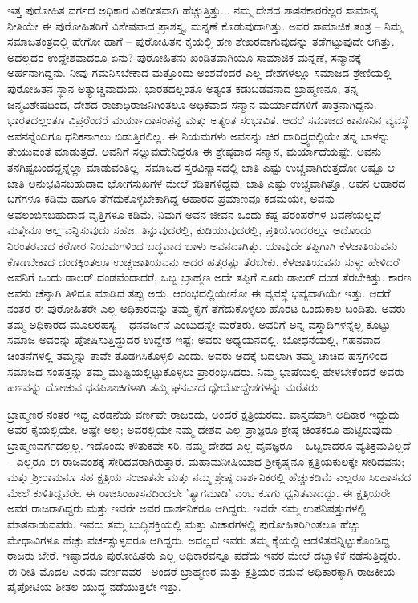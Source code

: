 ಇತ್ತ ಪುರೋಹಿತ ವರ್ಗದ ಅಧಿಕಾರ ವಿಪರೀತವಾಗಿ ಹೆಚ್ಚುತ್ತಿತ್ತು... ನಮ್ಮ ದೇಶದ ಶಾಸನಕಾರರೆಲ್ಲರ ಸಾಮಾನ್ಯ ನೀತಿಯೇ ಈ ಪುರೋಹಿತರಿಗೆ ವಿಶೇಷವಾದ ಪ್ರಾಶಸ್ತ್ಯ, ಮನ್ನಣೆ ಕೊಡುವುದಾಗಿತ್ತು. ಅವರ ಸಾಮಾಜಿಕ ತಂತ್ರ – ನಿಮ್ಮ ಸಮಾಜತಂತ್ರದಲ್ಲಿ ಹೇಗೋ ಹಾಗೆ – ಪುರೋಹಿತನ ಕೈಯಲ್ಲಿ ಹಣ ಶೇಖರವಾಗುವುದನ್ನು ತಡೆಗಟ್ಟುವುದೇ ಆಗಿತ್ತು. ಅದೆಲ್ಲದರ ಉದ್ದೇಶವಾದರೂ ಏನು? ಪುರೋಹಿತನು ಖಂಡಿತವಾಗಿಯೂ ಸಾಮಾಜಿಕ ಮನ್ನಣೆ, ಸನ್ಮಾನಕ್ಕೆ ಅರ್ಹನಾಗಿದ್ದನು. ನೀವು ಗಮನಿಸಬೇಕಾದ ಮತ್ತೊಂದು ಅಂಶವೆಂದರೆ ಎಲ್ಲ ದೇಶಗಳಲ್ಲೂ ಸಮಾಜದ ಶ್ರೇಣಿಯಲ್ಲಿ ಪುರೋಹಿತನ ಸ್ಥಾನ ಅತ್ಯುಚ್ಚವಾದುದು. ಭಾರತದಲ್ಲಂತೂ ಅತ್ಯಂತ ಕಡುಬಡವನಾದ ಬ್ರಾಹ್ಮಣನೂ, ತನ್ನ ಜನ್ಮವಿಶೇಷದಿಂದ, ದೇಶದ ರಾಜಾಧಿರಾಜನಿಗಿಂತಲೂ ಅಧಿಕವಾದ ಸನ್ಮಾನ ಮರ್ಯಾದೆಗಳಿಗೆ ಪಾತ್ರನಾಗಿದ್ದನು. ಭಾರತದಲ್ಲಂತೂ ವಿಪ್ರರೆಂದರೆ ಮರ್ಯಾದಾಸಂಪನ್ನ ಮತ್ತು ಅತ್ಯಂತ ಸಂಭಾವಿತ. ಆದರೆ ಸಮಾಜದ ಕಾನೂನಿನ ವ್ಯವಸ್ಥೆ ಅವನನ್ನೆಂದಿಗೂ ಧನಿಕನಾಗಲು ಬಿಡುತ್ತಿರಲಿಲ್ಲ. ಈ ನಿಯಮಗಳು ಅವನನ್ನು ಚಿರ ದಾರಿದ್ರ್ಯದಲ್ಲಿಯೇ ತನ್ನ ಬಾಳನ್ನು ತೇಯುವಂತೆ ಮಾಡುತ್ತದೆ. ಅವನಿಗೆ ಸಲ್ಲುವುದೇನಿದ್ದರೂ ಈ ಶ್ರೇಷ್ಠವಾದ ಸನ್ಮಾನ, ಮರ್ಯಾದೆಯಷ್ಟೇ. ಅವನು ತನಗಿಷ್ಟಬಂದದ್ದನ್ನೆಲ್ಲಾ ಮಾಡುವಂತಿಲ್ಲ. ಸಮಾಜದ ಸ್ತರವಿನ್ಯಾಸದಲ್ಲಿ ಜಾತಿ ಎಷ್ಟು ಉಚ್ಚವಾಗಿರುತ್ತದೋ ಅಷ್ಟೂ ಆ ಜಾತಿ ಅನುಭವಿಸಬಹುದಾದ ಭೋಗಸುಖಗಳ ಮೇಲೆ ಕಡಿತಗಳಿದ್ದವು. ಜಾತಿ ಎಷ್ಟು ಉಚ್ಚವಾಗಿತ್ತೊ, ಅವನ ಆಹಾರದ ಬಗೆಗಳೂ ಕಡಿಮೆ ಹಾಗೂ ತೆಗೆದುಕೊಳ್ಳಬೇಕಾಗಿದ್ದ ಆಹಾರದ ಪ್ರಮಾಣವೂ ಕಡಮೆಯೇ, ಅವನು ಅವಲಂಬಿಸಬಹುದಾದ ವೃತ್ತಿಗಳೂ ಕಡಿಮೆ. ನಿಮಗೆ ಅವನ ಜೀವನ ಒಂದು ಕಷ್ಟ ಪರಂಪರೆಗಳ ಬವಣೆಯಲ್ಲದೆ ಮತ್ತೇನೂ ಅಲ್ಲ ಎನ್ನಿಸುವುದು ಸಹಜ. ತಿನ್ನುವುದರಲ್ಲಿ, ಕುಡಿಯುವುದರಲ್ಲಿ, ಪ್ರತಿಯೊಂದರಲ್ಲೂ ಅದೊಂದು ನಿರಂತರವಾದ ಕಠೋರ ನಿಯಮಗಳಿಂದ ಬದ್ಧವಾದ ಬಾಳು ಅವನದಾಗಿತ್ತು. ಯಾವುದೇ ತಪ್ಪಿಗಾಗಿ ಕೆಳಜಾತಿಯವನು ಕೊಡಬೇಕಾದ ದಂಡಕ್ಕಿಂತಲೂ ಉಚ್ಚಜಾತಿಯವನು ಅದರ ಹತ್ತರಷ್ಟು ತೆರಬೇಕು. ಕೆಳಜಾತಿಯವನು ಸುಳ್ಳು ಹೇಳಿದರೆ ಅವನಿಗೆ ಒಂದು ಡಾಲರ್ ದಂಡವೆಂದಾದರೆ, ಒಬ್ಬ ಬ್ರಾಹ್ಮಣ ಅದೇ ತಪ್ಪಿಗೆ ನೂರು ಡಾಲರ್ ದಂಡ ತೆರಬೇಕಿತ್ತು. ಕಾರಣ ಅವನು ಚೆನ್ನಾಗಿ ತಿಳಿದೂ ಮಾಡಿದ ತಪ್ಪು ಅದು. ಆರಂಭದಲ್ಲಿಯೇನೋ ಈ ವ್ಯವಸ್ಥೆ ಭವ್ಯವಾಗಿಯೇ ಇತ್ತು. ಆದರೆ ನಂತರ ಈ ಪುರೋಹಿತರೇ ಎಲ್ಲ ಅಧಿಕಾರವನ್ನು ತಮ್ಮ ಕೈಗೆ ತೆಗೆದುಕೊಳ್ಳಲು ಹೊರಟ ಒಂದುಕಾಲ ಬಂದಿತು. ಅವರು ತಮ್ಮ ಅಧಿಕಾರದ ಮೂಲರಹಸ್ಯ – ಧನವರ್ಜನೆ ಎಂಬುದನ್ನೇ ಮರೆತರು. ಅವರಿಗೆ ಅನ್ನ ವಸ್ತ್ರಾದಿಗಳನ್ನೆಲ್ಲ ಕೊಟ್ಟು ಸಮಾಜ ಅವರನ್ನು ಪೋಷಿಸುತ್ತಿದ್ದುದರ ಉದ್ದೇಶ ಇಷ್ಟೆ; ಅವರು ಅಧ್ಯಯನದಲ್ಲಿ, ಬೋಧನೆಯಲ್ಲಿ, ಗಹನವಾದ ಚಿಂತನೆಗಳಲ್ಲಿ ತಮ್ಮನ್ನು ತಾವೇ ತೊಡಗಿಸಿಕೊಳ್ಳಲಿ ಎಂದು. ಅವರು ಅದಕ್ಕೆ ಬದಲಾಗಿ ತಮ್ಮ ಚಾಚಿದ ಹಸ್ತಗಳಿಂದ ಸಮಾಜದ ಸಂಪತ್ತನ್ನು ತಮ್ಮ ಮುಷ್ಟಿಯಲ್ಲಿಟ್ಟುಕೊಳ್ಳಲು ಪ್ರಾರಂಭಿಸಿದರು. ನಿಮ್ಮ ಭಾಷೆಯಲ್ಲಿ ಹೇಳಬೇಕೆಂದರೆ ಅವರು ಹಣವನ್ನು ದೋಚುವ ಧನಪಿಶಾಚಿಗಳಾಗಿ ತಮ್ಮ ಘನವಾದ ಧ್ಯೇಯೋದ್ದೇಶಗಳನ್ನು ಮರೆತರು.

ಬ್ರಾಹ್ಮಣರ ನಂತರ ಇದ್ದ ಎರಡನೆಯ ವರ್ಣವೇ ರಾಜರದು, ಅಂದರೆ ಕ್ಷತ್ರಿಯರದು. ವಾಸ್ತವವಾಗಿ ಅಧಿಕಾರ ಇದ್ದುದು ಅವರ ಕೈಯಲ್ಲಿಯೇ. ಅಷ್ಟೇ ಅಲ್ಲ; ಅವರಲ್ಲಿಯೇ ನಮ್ಮ ದೇಶದ ಎಲ್ಲ ಪ್ರಾಜ್ಞರೂ ಶ್ರೇಷ್ಠ ಚಿಂತಕರೂ ಹುಟ್ಟಿರುವುದು – ಬ್ರಾಹ್ಮಣವರ್ಗದಲ್ಲಲ್ಲ. ಇದೊಂದು ಕೌತುಕವೇ ಸರಿ. ನಮ್ಮ ದೇಶದ ಎಲ್ಲ ದೈವಜ್ಞರೂ – ಒಬ್ಬರಾದರೂ ವ್ಯತಿಕ್ರಮವಿಲ್ಲದೆ – ಎಲ್ಲರೂ ಈ ರಾಜವಂಶಕ್ಕೆ ಸೇರಿದವರಾಗಿರುತ್ತಾರೆ. ಮಹಾಮನೀಷಿಯಾದ ಶ‍್ರೀಕೃಷ್ಣನೂ ಕ್ಷತ್ರಿಯಕುಲಕ್ಕೇ ಸೇರಿದವನು; ಮತ್ತು ಶ‍್ರೀರಾಮನೂ ಸಹ ಕ್ಷತ್ರಿಯ ಸಂಜಾತನೇ ಮತ್ತು ನಮ್ಮ ಶ್ರೇಷ್ಠ ದಾರ್ಶನಿಕರಲ್ಲಿ ಹೆಚ್ಚುಕಡಿಮೆ ಎಲ್ಲರೂ ಸಿಂಹಾಸನದ ಮೇಲೆ ಕುಳಿತಿದ್ದವರೇ. ಈ ರಾಜಸಿಂಹಾಸನದಿಂದಲೇ 'ತ್ಯಾಗಮಾಡಿ' ಎಂಬ ಕೂಗು ಧ್ವನಿತವಾದದ್ದು. ಈ ಕ್ಷತ್ರಿಯರೇ ಅವರ ರಾಜರಾಗಿದ್ದರು ಮತ್ತು ಇವರೇ ಅವರ ದಾರ್ಶನಿಕರೂ ಆಗಿದ್ದರು. ಇವರೇ ನಮ್ಮ ಉಪನಿಷತ್ತುಗಳಲ್ಲಿ ಮಾತನಾಡುವವರು. ಇವರು ತಮ್ಮ ಬುದ್ಧಿಶಕ್ತಿಯಲ್ಲಿ ಮತ್ತು ವಿಚಾರಗಳಲ್ಲಿ ಪುರೋಹಿತರಿಗಿಂತಲೂ ಹೆಚ್ಚು ಮೇಧಾವಿಗಳೂ ಹೆಚ್ಚು ವರ್ಚಸ್ಸುಳ್ಳವರೂ ಆಗಿದ್ದರು. ಅದಲ್ಲದೆ ಇವರು ತಮ್ಮ ಕೈಯಲ್ಲಿ ಆಡಳಿತವನ್ನಿಟ್ಟುಕೊಂಡಿದ್ದ ರಾಜರು ಬೇರೆ. ಇಷ್ಟಾದರೂ ಪುರೋಹಿತರು ಎಲ್ಲ ಅಧಿಕಾರವನ್ನೂ ಪಡೆದು ಇವರ ಮೇಲೆ ದಬ್ಬಾಳಿಕೆ ನಡೆಸುತ್ತಿದ್ದರು. ಈ ರೀತಿ ಮೊದಲ ಎರಡು ವರ್ಣದವರ– ಅಂದರೆ ಬ್ರಾಹ್ಮಣರ ಮತ್ತು ಕ್ಷತ್ರಿಯರ ನಡುವೆ ಅಧಿಕಾರಕ್ಕಾಗಿ ರಾಜಕೀಯ ಪೈಪೋಟಿಯ ಶೀತಲ ಯುದ್ಧ ನಡೆಯುತ್ತಲೇ ಇತ್ತು.

